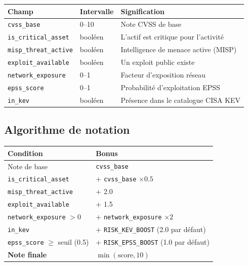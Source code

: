 \documentclass[11pt,a4paper]{article}
\begin{document}
\begin{center}
\small
\begin{tabularx}{\linewidth}{@{}l l X@{}}
\toprule
\textbf{Champ} & \textbf{Intervalle} & \textbf{Signification} \\
\midrule
\texttt{cvss\_base} & 0--10 & Note CVSS de base \\
\texttt{is\_critical\_asset} & bool\'een & L'actif est critique pour l'activit\'e \\
\texttt{misp\_threat\_active} & bool\'een & Intelligence de menace active (MISP) \\
\texttt{exploit\_available} & bool\'een & Un exploit public existe \\
\texttt{network\_exposure} & 0--1 & Facteur d'exposition r\'eseau \\
\texttt{epss\_score} & 0--1 & Probabilit\'e d'exploitation EPSS \\
\texttt{in\_kev} & bool\'een & Pr\'esence dans le catalogue CISA KEV \\
\bottomrule
\end{tabularx}
\end{center}

\subsection{Algorithme de notation}

\begin{center}
\small
\begin{tabularx}{\linewidth}{@{}X l@{}}
\toprule
\textbf{Condition} & \textbf{Bonus} \\
\midrule
Note de base & \texttt{cvss\_base} \\
\texttt{is\_critical\_asset} & $+$ \texttt{cvss\_base} $\times 0.5$ \\
\texttt{misp\_threat\_active} & $+$ 2.0 \\
\texttt{exploit\_available} & $+$ 1.5 \\
\texttt{network\_exposure} $> 0$ & $+$ \texttt{network\_exposure} $\times 2$ \\
\texttt{in\_kev} & $+$ \texttt{RISK\_KEV\_BOOST} (2.0 par d\'efaut) \\
\texttt{epss\_score} $\geq$ seuil (0.5) & $+$ \texttt{RISK\_EPSS\_BOOST} (1.0 par d\'efaut) \\
\midrule
\textbf{Note finale} & $\min(\text{score}, 10)$ \\
\bottomrule
\end{tabularx}
\end{center}
\end{document}

